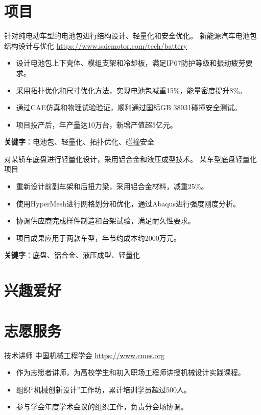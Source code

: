 \documentclass[a4paper, serif, 10pt]{moderncv}
\begin{document}
\section{项目}

        {针对纯电动车型的电池包进行结构设计、轻量化和安全优化。}
        {新能源汽车电池包结构设计与优化}
        {\url{https://www.saicmotor.com/tech/battery}}
        {}
        {\begin{itemize}
\item 设计电池包上下壳体、模组支架和冷却板，满足IP67防护等级和振动疲劳要求。
\item 采用拓扑优化和尺寸优化方法，实现电池包减重15\%，能量密度提升8\%。
\item 通过CAE仿真和物理试验验证，顺利通过国标GB 38031碰撞安全测试。
\item 项目投产后，年产量达10万台，新增产值超5亿元。
\end{itemize}
\textbf{关键字}：电池包、轻量化、拓扑优化、碰撞安全}

        {对某轿车底盘进行轻量化设计，采用铝合金和液压成型技术。}
        {某车型底盘轻量化项目}
        {}
        {}
        {\begin{itemize}
\item 重新设计前副车架和后扭力梁，采用铝合金材料，减重25\%。
\item 使用HyperMesh进行网格划分和优化，通过Abaqus进行强度刚度分析。
\item 协调供应商完成样件制造和台架试验，满足耐久性要求。
\item 项目成果应用于两款车型，年节约成本约2000万元。
\end{itemize}
\textbf{关键字}：底盘、铝合金、液压成型、轻量化}
\section{兴趣爱好}

\section{志愿服务}

        {技术讲师}
        {中国机械工程学会}
        {\url{https://www.cmes.org}}
        {}
        {\begin{itemize}
\item 作为志愿者讲师，为高校学生和初入职场工程师讲授机械设计实践课程。
\item 组织“机械创新设计”工作坊，累计培训学员超过500人。
\item 参与学会年度学术会议的组织工作，负责分会场协调。
\end{itemize}}
    
\end{document}
